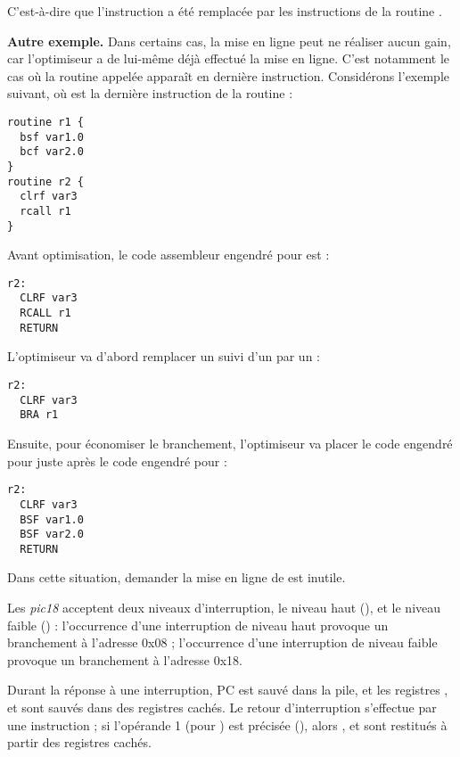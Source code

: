 C'est-à-dire que l'instruction  a été remplacée par les instructions de la routine .

\textbf{Autre exemple.} Dans certains cas, la mise en ligne peut ne réaliser aucun gain, car l'optimiseur a de lui-même déjà effectué la mise en ligne. C'est notamment le cas où la routine appelée apparaît en dernière instruction. Considérons l'exemple suivant, où  est la dernière instruction de la routine  :
\begin{lstlisting}[language=piccolo]
routine r1 {
  bsf var1.0
  bcf var2.0
}
routine r2 {
  clrf var3
  rcall r1
}
\end{lstlisting}

Avant optimisation, le code assembleur engendré pour  est :
\begin{lstlisting}[language=assembleur]
r2:
  CLRF var3
  RCALL r1
  RETURN
\end{lstlisting}

L'optimiseur va d'abord remplacer un  suivi d'un  par un  :
\begin{lstlisting}[language=assembleur]
r2:
  CLRF var3
  BRA r1
\end{lstlisting}

Ensuite, pour économiser le branchement, l'optimiseur va placer le code engendré pour  juste après le code engendré pour  :
\begin{lstlisting}[language=assembleur]
r2:
  CLRF var3
  BSF var1.0
  BSF var2.0
  RETURN
\end{lstlisting}

Dans cette situation, demander la mise en ligne de  est inutile.






Les \emph{pic18} acceptent deux niveaux d’interruption, le niveau haut (), et le niveau faible () :
l’occurrence d’une interruption de niveau haut provoque un branchement à l’adresse 0x08 ;
l’occurrence d’une interruption de niveau faible provoque un branchement à l’adresse 0x18.

Durant la réponse à une interruption, PC est sauvé dans la pile, et les registres ,  et  sont sauvés dans des registres cachés. Le retour d’interruption s’effectue par une instruction  ; si l’opérande 1 (pour ) est précisée (), alors ,  et  sont restitués à partir des registres cachés.

